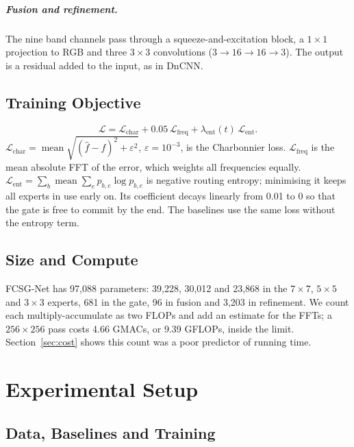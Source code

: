\documentclass[12pt,a4paper,oneside]{NITR}
\newcommand{\fcsg}{FCSG-Net}
\begin{document}
\paragraph{Fusion and refinement.} The nine band channels pass through a
squeeze-and-excitation block, a $1\times1$ projection to RGB
and three $3\times3$ convolutions ($3\to16\to16\to3$). The output is a
residual added to the input, as in DnCNN.

\section{Training Objective}\label{sec:loss}

\begin{equation}
	\mathcal{L}=\mathcal{L}_\text{char}+0.05\,\mathcal{L}_\text{freq}+\lambda_\text{ent}(t)\,\mathcal{L}_\text{ent}.
\end{equation}
$\mathcal{L}_\text{char}=\operatorname{mean}\sqrt{(\hat f-f)^2+\varepsilon^2}$,
$\varepsilon=10^{-3}$, is the Charbonnier loss.
$\mathcal{L}_\text{freq}$ is the mean absolute FFT of the error, which weights
all frequencies equally. $\mathcal{L}_\text{ent}=\sum_b\operatorname{mean}
\sum_e p_{b,e}\log p_{b,e}$ is negative routing entropy; minimising it keeps
all experts in use early on. Its coefficient decays linearly from 0.01 to 0
so that the gate is free to commit by the end. The baselines use the same
loss without the entropy term.

\section{Size and Compute}\label{sec:size}

\fcsg{} has 97,088 parameters: 39,228, 30,012 and 23,868 in the $7\times7$,
$5\times5$ and $3\times3$ experts, 681 in the gate, 96 in fusion and 3,203 in
refinement. We count each multiply-accumulate as two FLOPs and add an
estimate for the FFTs; a $256\times256$ pass costs 4.66 GMACs, or 9.39
GFLOPs, inside the limit. Section~\ref{sec:cost} shows this count was a poor
predictor of running time.


\chapter{Experimental Setup}\label{ch:setup}

\section{Data, Baselines and Training}\label{sec:training}
\end{document}
